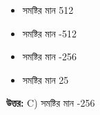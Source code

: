\documentclass[12pt, a4paper]{article}
\begin{document}
\begin{itemize}[label={}, leftmargin=1cm, itemsep=0.5em]
    \item[\textbf{A)}] সমষ্টির মান 512
    \item[\textbf{B)}] সমষ্টির মান -512
    \item[\textbf{C)}] সমষ্টির মান -256
    \item[\textbf{D)}] সমষ্টির মান 25
\end{itemize}

\vspace{0.5em}
\begin{tcolorbox}[answerbox]
    \textbf{\color{success} উত্তর:} C) সমষ্টির মান -256
\end{tcolorbox}
\vspace{1em}
\end{document}
